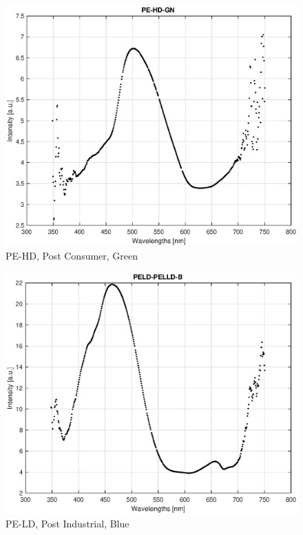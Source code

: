 \begin{appendices}
\begin{figure}
    \centering
    \includegraphics[width = 12cm]{Images/appendix/pe-hd-postconsumer-green.eps}
    \caption[$\; \:$PE-HD Post Consumer, Green]{PE-HD, Post Consumer, Green}
    \label{fig:pehd-green}
\end{figure}

\begin{figure}
    \centering
    \includegraphics[width = 12cm]{Images/appendix/pe-ld-postindust-blue.eps}
    \caption[$\; \:$PE-LD Post Industrial, Blue]{PE-LD, Post Industrial, Blue}
    \label{fig:peld-blue}
\end{figure}


\end{appendices}
